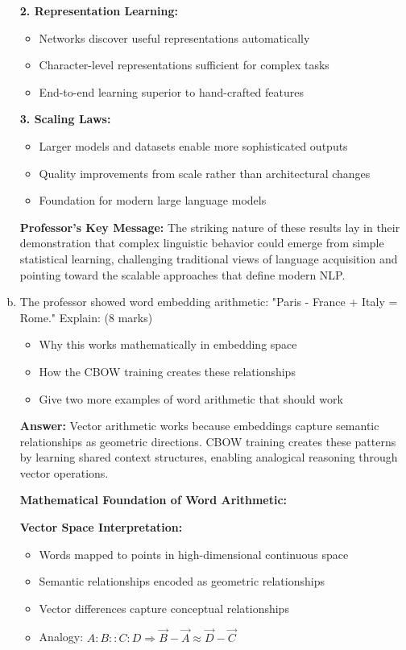 \documentclass[12pt]{article}
\newcommand{\answer}[1]{{\color{answercolor}\textbf{Answer:} #1}}
\newcommand{\explanation}[1]{{\color{explanationcolor}#1}}
\begin{document}
\begin{enumerate}[(a)]
{    \textbf{2. Representation Learning:}
    \begin{itemize}
        \item Networks discover useful representations automatically
        \item Character-level representations sufficient for complex tasks
        \item End-to-end learning superior to hand-crafted features
    \end{itemize}
    
    \textbf{3. Scaling Laws:}
    \begin{itemize}
        \item Larger models and datasets enable more sophisticated outputs
        \item Quality improvements from scale rather than architectural changes
        \item Foundation for modern large language models
    \end{itemize}
    
    \textbf{Professor's Key Message:}
    The striking nature of these results lay in their demonstration that complex linguistic behavior could emerge from simple statistical learning, challenging traditional views of language acquisition and pointing toward the scalable approaches that define modern NLP.
    }
    
    \item The professor showed word embedding arithmetic: "Paris - France + Italy = Rome." Explain: \hfill (8 marks)
    \begin{itemize}
        \item Why this works mathematically in embedding space
        \item How the CBOW training creates these relationships
        \item Give two more examples of word arithmetic that should work
    \end{itemize}
    
    \answer{Vector arithmetic works because embeddings capture semantic relationships as geometric directions. CBOW training creates these patterns by learning shared context structures, enabling analogical reasoning through vector operations.}
    
    \explanation{
    \textbf{Mathematical Foundation of Word Arithmetic:}
    
    \textbf{Vector Space Interpretation:}
    \begin{itemize}
        \item Words mapped to points in high-dimensional continuous space
        \item Semantic relationships encoded as geometric relationships
        \item Vector differences capture conceptual relationships
        \item Analogy: $A : B :: C : D \Rightarrow \vec{B} - \vec{A} \approx \vec{D} - \vec{C}$
    \end{itemize}
    
}
\end{enumerate}
\end{document}
